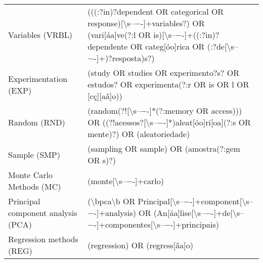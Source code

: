 \begin{table}
\begin{tabular}{ll}
Variables (VRBL) & (((:?in)?dependent OR categorical OR response)[\textbackslash s–−-]+variables?) OR (vari[áa]ve(?:l OR is)[\textbackslash s–−-]+((:?in)?dependente OR categ[óo]rica OR (:?de[\textbackslash s–−-]+)?resposta)s?) \\
Experimentation (EXP) & (study OR studies OR experimento?s? OR estudos? OR experimenta(?:r OR is OR l OR [cç][aã]o)) \\
Random (RND) & (random(?![\textbackslash s–−-]*(?:memory OR access))) OR ((?!acessos?[\textbackslash s–−-]*)aleat[óo]ri[oa](?:s OR mente)?) OR (aleatoriedade) \\
Sample (SMP) & (sampling OR sample) OR (amostra(?:gem OR s)?) \\
Monte Carlo Methods (MC) & (monte[\textbackslash s–−-]+carlo) \\
Principal component analysis (PCA) & (\textbackslash bpca\textbackslash b OR Principal[\textbackslash s–−-]+component[\textbackslash s–−-]+analysis) OR (An[áa]lise[\textbackslash s–−-]+de[\textbackslash s–−-]+componentes[\textbackslash s–−-]+principais) \\
Regression methods (REG) & (regression) OR (regress[ãa]o) \\
\end{tabular}
\end{table}
